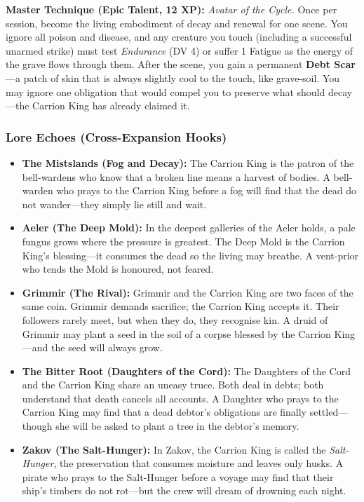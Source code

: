 \begin{tcolorbox}[colback=black!5,colframe=green!60!black,title=\textbf{Rot-Fist (The Carrion King)},breakable]
  \vspace{2mm}
  \noindent\textbf{Master Technique (Epic Talent, 12 XP):}
  \textit{Avatar of the Cycle.} Once per session, become the living embodiment of decay and renewal for one scene. You ignore all poison and disease, and any creature you touch (including a successful unarmed strike) must test \textit{Endurance} (DV 4) or suffer 1 Fatigue as the energy of the grave flows through them. After the scene, you gain a permanent \textbf{Debt Scar}---a patch of skin that is always slightly cool to the touch, like grave-soil. You may ignore one obligation that would compel you to preserve what should decay---the Carrion King has already claimed it.
\end{tcolorbox}

\subsubsection*{Lore Echoes (Cross-Expansion Hooks)}

\begin{itemize}
  \item \textbf{The Mistslands (Fog and Decay):} The Carrion King is the patron of the bell-wardens who know that a broken line means a harvest of bodies. A bell-warden who prays to the Carrion King before a fog will find that the dead do not wander---they simply lie still and wait.

  \item \textbf{Aeler (The Deep Mold):} In the deepest galleries of the Aeler holds, a pale fungus grows where the pressure is greatest. The Deep Mold is the Carrion King's blessing---it consumes the dead so the living may breathe. A vent-prior who tends the Mold is honoured, not feared.

  \item \textbf{Grimmir (The Rival):} Grimmir and the Carrion King are two faces of the same coin. Grimmir demands sacrifice; the Carrion King accepts it. Their followers rarely meet, but when they do, they recognise kin. A druid of Grimmir may plant a seed in the soil of a corpse blessed by the Carrion King---and the seed will always grow.

  \item \textbf{The Bitter Root (Daughters of the Cord):} The Daughters of the Cord and the Carrion King share an uneasy truce. Both deal in debts; both understand that death cancels all accounts. A Daughter who prays to the Carrion King may find that a dead debtor's obligations are finally settled---though she will be asked to plant a tree in the debtor's memory.

  \item \textbf{Zakov (The Salt-Hunger):} In Zakov, the Carrion King is called the \textit{Salt-Hunger}, the preservation that consumes moisture and leaves only husks. A pirate who prays to the Salt-Hunger before a voyage may find that their ship's timbers do not rot---but the crew will dream of drowning each night.
\end{itemize}

